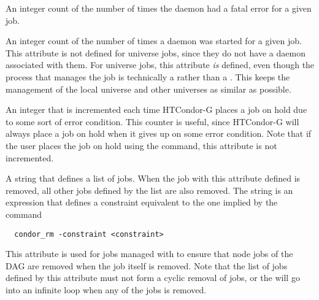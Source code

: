 \begin{description}
\item[\AdAttr{NumShadowExceptions}:]  An integer count of the number of
  times the  daemon had a fatal error for a given job.

\item[\AdAttr{NumShadowStarts}:]  An integer count of the number of
  times a  daemon was started for a given job.
  This attribute is not defined for
   universe jobs, since
  they do not have a  daemon associated with them.
  For  universe jobs, this attribute \emph{is}
  defined, even though the process that manages the job is technically
  a  rather than a .  
  This keeps the management of the
  local universe and other universes as similar as possible.

\item[\AdAttr{NumSystemHolds}:]   An integer that is incremented each time
HTCondor-G places a job on hold due to some sort of error condition.  This
counter is useful, since HTCondor-G will always place a job on hold when it
gives up on some error condition.  Note that if the user places the job
on hold using the  command, this attribute is not incremented.

\label{attribute-OtherJobRemoveRequirements}
\item[\AdAttr{OtherJobRemoveRequirements}:]
A string that defines a list of jobs.
When the job with this attribute defined is removed,
all other jobs defined by the list are also removed.
The string is an expression that defines a constraint equivalent to
the one implied by the command 
\begin{verbatim}
  condor_rm -constraint <constraint>
\end{verbatim}
This attribute is used for jobs managed with  to ensure
that node jobs of the DAG are removed when the  job
itself is removed.  Note that the list of jobs defined by this attribute
must not form a cyclic removal of jobs,
or the  will go into an infinite loop 
when any of the jobs is removed.


\end{description}
